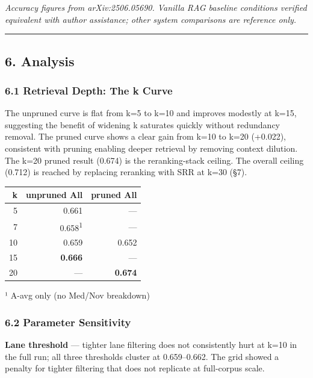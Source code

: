 \emph{Accuracy figures from arXiv:2506.05690. Vanilla RAG baseline conditions verified equivalent with author assistance; other system comparisons are reference only.}

\begin{center}\rule{0.5\linewidth}{0.5pt}\end{center}

\subsection{6. Analysis}\label{analysis}

\subsubsection{6.1 Retrieval Depth: The k Curve}\label{retrieval-depth-the-k-curve}

The unpruned curve is flat from k=5 to k=10 and improves modestly at k=15, suggesting the benefit of widening k saturates quickly without redundancy removal. The pruned curve shows a clear gain from k=10 to k=20 (+0.022), consistent with pruning enabling deeper retrieval by removing context dilution. The k=20 pruned result (0.674) is the reranking-stack ceiling. The overall ceiling (0.712) is reached by replacing reranking with SRR at k=30 (§7).

\begin{small}
\setlength{\tabcolsep}{4pt}
\begin{longtable}{rrr}
\toprule
\textbf{k} & \textbf{unpruned All} & \textbf{pruned All} \\
\midrule
\endhead
5 & 0.661 & — \\
7 & 0.658\textsuperscript{1} & — \\
10 & 0.659 & 0.652 \\
15 & \textbf{0.666} & — \\
20 & — & \textbf{0.674} \\
\bottomrule
\end{longtable}
\end{small}

¹ A-avg only (no Med/Nov breakdown)

\subsubsection{6.2 Parameter Sensitivity}\label{parameter-sensitivity}

\textbf{Lane threshold} --- tighter lane filtering does not consistently hurt at k=10 in the full run; all three thresholds cluster at 0.659--0.662. The grid showed a penalty for tighter filtering that does not replicate at full-corpus scale.


